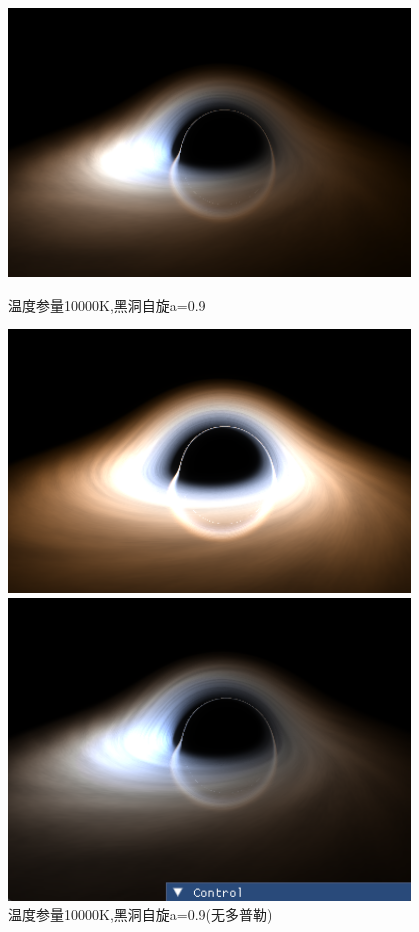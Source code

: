 \documentclass[a4paper, 12pt]{article}
\begin{document}
\begin{figure}[H]
\begin{minipage}[t]{0.48\textwidth}
            \includegraphics[width=0.95\textwidth]{photo/10kT.png}
            \caption{温度参量10000K,黑洞自旋a=0.9}
        \end{minipage}
        \hfill
        \begin{minipage}[t]{0.48\textwidth}
            \centering
            \includegraphics[width=0.95\textwidth]{photo/10kT_ND.png}
            \caption{温度参量10000K,黑洞自旋a=0.9(无多普勒)}
        \end{minipage}
        \begin{minipage}[t]{0.48\textwidth}
            \centering
            \includegraphics[width=0.95\textwidth]{photo/14kT.png}

\end{minipage}
\end{figure}
\end{document}
